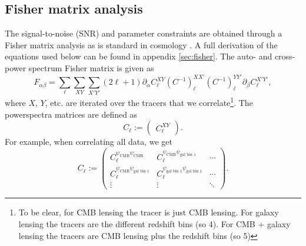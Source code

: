 \documentclass[11pt]{article} %
\begin{document}
\subsection{Fisher matrix analysis}
The signal-to-noise (SNR) and parameter constraints are obtained through a Fisher matrix analysis as is standard in cosmology \cite{dodelson2020modern, Knox1995, Tegmark1997}. A full derivation of the equations used below can be found in appendix \ref{sec:fisher}. The auto- and cross- power spectrum Fisher matrix is given as
\begin{equation*}
    F_{\alpha\beta} = \sum_{\ell} \sum_{XY}\sum_{X'Y'}(2\ell+1)\partial_\alpha C_\ell^{XY} (C^{-1})_\ell^{XX'}(C^{-1})_\ell^{YY'} \partial_\beta C^{X'Y'}_\ell,
\end{equation*}
where $X$, $Y$, etc. are iterated over the tracers that we correlate\footnote{To be clear, for CMB lensing the tracer is just CMB lensing. For galaxy lensing the tracers are the different redshift bins (so 4). For CMB + galaxy lensing the tracers are CMB lensing plus the redshift bins (so 5)}. The powerspectra matrices are defined as
\begin{equation*}
    C_{\ell} := \begin{pmatrix}
        C^{XY}_\ell
    \end{pmatrix}.
\end{equation*}
For example, when correlating all data, we get
\begin{equation*}
    C_{\ell} := \begin{pmatrix}
        C^{\psi_{\text{CMB}}\psi_{\text{CMB}}}_\ell & C^{\psi_{\text{CMB}}\psi_{\text{gal bin 1}}}_\ell & \cdots \\
        C^{\psi_{\text{CMB}}\psi_{\text{gal bin 1}}}_\ell & C^{\psi_{\text{gal bin 1}}\psi_{\text{gal bin 1}}}_\ell & \cdots \\
        \vdots & \vdots & \ddots
    \end{pmatrix}.
\end{equation*}
\end{document}
